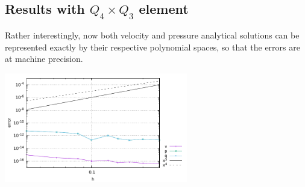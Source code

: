 \subsection*{Results with $Q_4\times Q_3$ element}

Rather interestingly, now both velocity and pressure analytical solutions 
can be represented exactly by their respective polynomial spaces, so that 
the errors are at machine precision.

\begin{center}
\includegraphics[width=8cm]{python_codes/fieldstone_48/images/errors4.pdf}
\end{center}



